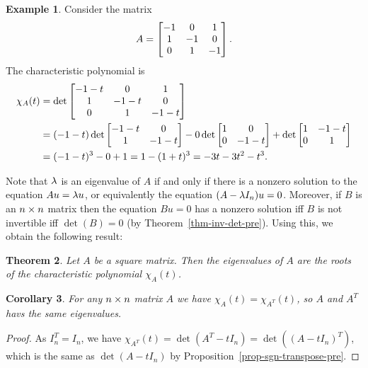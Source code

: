 \documentclass[reqno]{amsart}
\newtheorem{theorem}{Theorem}[section]
\newtheorem{corollary}[theorem]{Corollary}
\theoremstyle{definition}
\newtheorem{example}[theorem]{Example}
\begin{document}
\begin{example}\label{eg-chi-three}
 Consider the matrix
 \[ A = \left[\begin{matrix} -1 & 0 & 1 \\ 1 & -1 & 0 \\ 0 & 1 & -1 \end{matrix}\right]. \]
 The characteristic polynomial is
 \begin{align*}
  \chi_A(t) &=
   \det \left[\begin{matrix} -1-t & 0 & 1 \\ 1 & -1-t & 0 \\ 0 & 1 & -1-t \end{matrix}\right] \\
   &= (-1-t) \det \left[\begin{matrix} -1-t & 0 \\ 1 & -1-t \end{matrix}\right]
      - 0 \det \left[\begin{matrix} 1 & 0 \\ 0 & -1-t \end{matrix}\right]
      + \det \left[\begin{matrix} 1 & -1-t \\ 0 & 1 \end{matrix}\right] \\
   &= (-1-t)^3  - 0 + 1 = 1-(1+t)^3
    = -3t-3t^2-t^3.
 \end{align*}
\end{example}

Note that $\lambda$ is an eigenvalue of $A$ if and only if there is a
nonzero solution to the equation $Au=\lambda u$, or equivalently the
equation $(A-\lambda I_n)u=0$.  Moreover, if $B$ is an $n\times n$ matrix
then the equation $Bu=0$ has a nonzero solution iff $B$ is
not invertible iff $\det(B)=0$ (by Theorem~\ref{thm-inv-det-pre}).
Using this, we obtain the following result:
\begin{theorem}\label{thm-chi-roots}
 Let $A$ be a square matrix.  Then the eigenvalues of $A$ are the
 roots of the characteristic polynomial $\chi_A(t)$.
\end{theorem}

\begin{corollary}\label{cor-eigen-transpose}
 For any $n\times n$ matrix $A$ we have $\chi_A(t)=\chi_{A^T}(t)$, so $A$
 and $A^T$ havs the same eigenvalues.
\end{corollary}
\begin{proof}
 As $I_n^T=I_n$, we have
 $\chi_{A^T}(t)=\det(A^T-tI_n)=\det((A-tI_n)^T)$, which is the same as
 $\det(A-tI_n)$ by Proposition~\ref{prop-sgn-transpose-pre}.
\end{proof}
\end{document}
